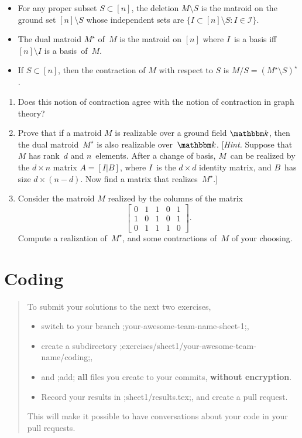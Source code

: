 \documentclass[11pt]{amsart}
\newcommand{\defn}[1]{{\color{blue}#1}}
\newcommand{\alert}[1]{\textbf{\color{red}#1}}
\begin{document}
\begin{itemize}[$\triangleright$]
\item
  For any proper subset $S\subset[n]$, the \defn{deletion}
  $M\setminus S$ is the matroid on the ground set $[n]\setminus S$ whose
  independent sets are $\{I\subset[n]\setminus S : I\in\mathcal I\}$.

\item
  The \defn{dual matroid} $M^\star$ of~$M$ is the matroid on $[n]$ where $I$~is a basis iff $[n]\setminus I$ is a basis~of~$M$.

\item
  If $S\subset[n]$, then the \defn{contraction} of $M$ with respect to $S$ is $M/S = (M^\star\setminus S)^\star$.
  
\end{itemize}

\bigskip
\begin{enumerate}
\item Does this notion of contraction agree with the notion of contraction in graph theory?

  \bigskip
\item Prove that if a matroid $M$ is realizable over a ground field $\mathbbm k$, then the dual matroid~$M^\star$ is also realizable over~$\mathbbm k$.
  {\footnotesize\color{green!30!black} [\emph{Hint.} Suppose that $M$ has rank~$d$ and $n$~elements.
  After a change of basis, $M$~can be realized by the $d\times n$ matrix $A=[I|B]$, where $I$~is the $d\times d$ identity matrix, and $B$~has size $d\times(n-d)$.
  Now find a matrix that realizes~$M^\star$.]
}

\bigskip
\item
  Consider the matroid $M$ realized by the columns of the matrix
  \[
    \begin{bmatrix}
      0 & 1 & 1 & 0 & 1 \\
      1 & 0 & 1 & 0 & 1 \\
      0 & 1 & 1 & 1 & 0
    \end{bmatrix}.
  \]
  Compute a realization of~$M^\star$, and some contractions of~$M$ of your choosing.
\end{enumerate}

\section*{Coding}

\begin{quote}\small
  To submit your solutions to the next two exercises,
  \begin{itemize}[$\quad\triangleright$]
  \item switch to your branch ;your-awesome-team-name-sheet-1;,
  \item create a subdirectory ;exercises/sheet1/your-awesome-team-name/coding;,
  \item and ;add; \alert{all} files you create to your commits, \alert{without encryption}.
  \item Record your results in ;sheet1/results.tex;, and create a pull request.
  \end{itemize}
  This will make it possible to have conversations about your code in your pull requests.
\end{quote}
\end{document}
